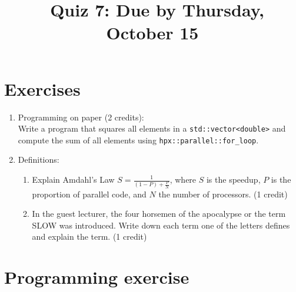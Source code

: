 \documentclass[11pt]{article}
\begin{document}
\title{\coursename~Quiz 7: Due by Thursday, October 15}
\date{}
\maketitle

\medskip


\section*{Exercises}

\begin{enumerate}
\item Programming on paper (2 credits): \\
Write a program that squares all elements in a \lstinline|std::vector<double>| and compute the sum of all elements using \lstinline|hpx::parallel::for_loop|. 


\item Definitions: \\
\begin{enumerate}
\item Explain Amdahl's Law $S=\frac{1}{(1-P)+\frac{P}{N}}$, where $S$ is the speedup, $P$ is the proportion of parallel code, and $N$ the number of processors. (1 credit)
\item In the guest lecturer, the four horsemen of the apocalypse or the term SLOW was introduced. Write down each term one of the letters defines and explain the term. (1 credit)
\end{enumerate}



\end{enumerate}

\section*{Programming exercise}
\end{document}
